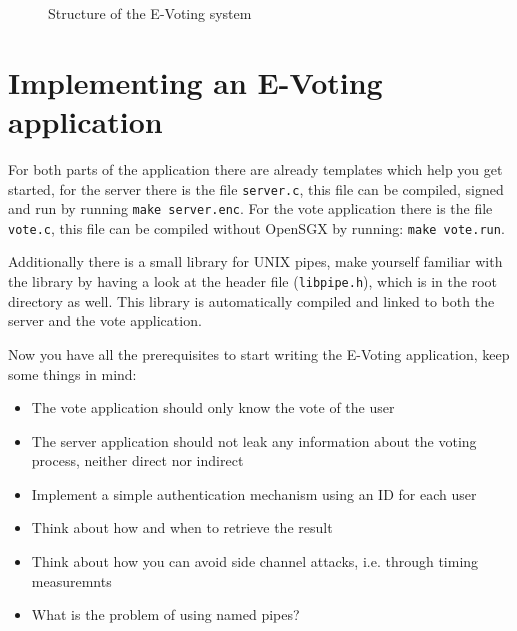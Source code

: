 \documentclass{uulm-assignment}
\begin{document}
    \begin{figure}[h]
        \centering
        \caption{Structure of the E-Voting system}
        \label{fig:struct}
    \end{figure}

    \section{Implementing an E-Voting application}
    For both parts of the application there are already templates which help you get
    started, for the server there is the file \texttt{server.c}, this file
    can be compiled, signed and run by running \texttt{make server.enc}.
    For the vote application there is the file \texttt{vote.c}, this
    file can be compiled without OpenSGX by running: \texttt{make vote.run}.    

    Additionally there is a small library for UNIX pipes, make yourself familiar
    with the library by having a look at the header file (\texttt{libpipe.h}),
    which is in the root directory as well. This library is automatically
    compiled and linked to both the server and the vote application.

    Now you have all the prerequisites to start writing the E-Voting application,
    keep some things in mind:
    \begin{itemize}
        \item The vote application should only know the vote of the user
        \item The server application should not leak any information about the voting process, neither direct nor indirect
        \item Implement a simple authentication mechanism using an ID for each user
        \item Think about how and when to retrieve the result
        \item Think about how you can avoid side channel attacks, i.e. through timing measuremnts
        \item What is the problem of using named pipes?
    \end{itemize}
\end{document}
